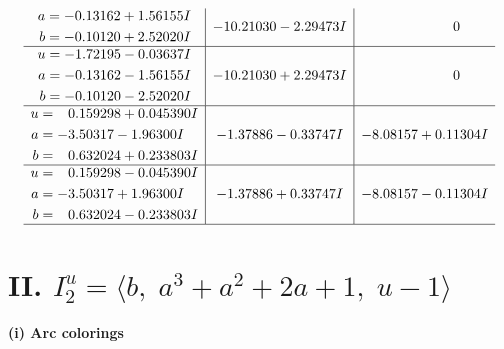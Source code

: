 \documentclass[1p]{elsarticle_modified}
\theoremstyle{definition}
\begin{document}
$$\begin{array}{c|c|c}
\begin{aligned}
a &= -0.13162 + 1.56155 I \\
b &= -0.10120 + 2.52020 I\end{aligned}
 & -10.21030 - 2.29473 I & \phantom{-0.000000 } 0 \\ \hline\begin{aligned}
u &= -1.72195 - 0.03637 I \\
a &= -0.13162 - 1.56155 I \\
b &= -0.10120 - 2.52020 I\end{aligned}
 & -10.21030 + 2.29473 I & \phantom{-0.000000 } 0 \\ \hline\begin{aligned}
u &= \phantom{-}0.159298 + 0.045390 I \\
a &= -3.50317 - 1.96300 I \\
b &= \phantom{-}0.632024 + 0.233803 I\end{aligned}
 & -1.37886 - 0.33747 I & -8.08157 + 0.11304 I \\ \hline\begin{aligned}
u &= \phantom{-}0.159298 - 0.045390 I \\
a &= -3.50317 + 1.96300 I \\
b &= \phantom{-}0.632024 - 0.233803 I\end{aligned}
 & -1.37886 + 0.33747 I & -8.08157 - 0.11304 I\\
 \hline 
 \end{array}$$\newpage\newpage\renewcommand{\arraystretch}{1}
\centering \section*{II. $I^u_{2}= \langle b,\;a^3+a^2+2 a+1,\;u-1 \rangle$}
\flushleft \textbf{(i) Arc colorings}\\
\end{document}
